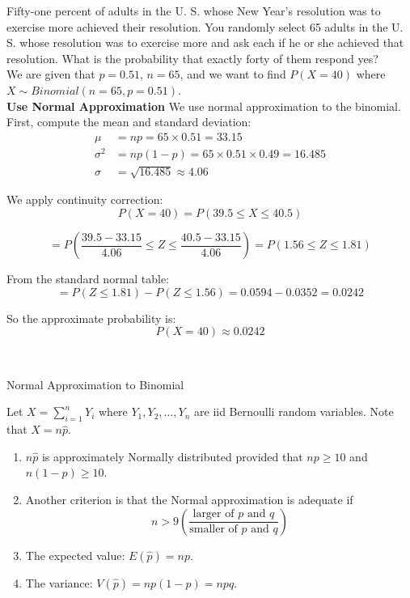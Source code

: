 \begin{example}

Fifty-one percent of adults in the U. S. whose New Year’s resolution was to exercise more achieved their resolution. You randomly select 65 adults in the U. S. whose resolution was to exercise more and ask each if he or she achieved that resolution. What is the probability that exactly forty of them respond yes?\\

We are given that $p = 0.51$, $n = 65$, and we want to find $P(X = 40)$ where $X \sim Binomial(n = 65, p = 0.51)$.\\

\textbf{Use Normal Approximation}
\vspace{0.5 em}
We use normal approximation to the binomial. First, compute the mean and standard deviation:
\begin{align*}
\mu &= np = 65 \times 0.51 = 33.15 \\
\sigma^2 &= np(1-p) = 65 \times 0.51 \times 0.49 = 16.485 \\
\sigma &= \sqrt{16.485} \approx 4.06
\end{align*}


We apply continuity correction:
\[
P(X = 40) = P(39.5 \leq X \leq 40.5)
\]

\[
= P\left(\frac{39.5 - 33.15}{4.06} \leq Z \leq \frac{40.5 - 33.15}{4.06}\right) = P(1.56 \leq Z \leq 1.81)
\]

From the standard normal table:
\[
= P(Z \leq 1.81) - P(Z \leq 1.56) = 0.0594 - 0.0352 = 0.0242
\]

So the approximate probability is:
\[
P(X = 40) \approx 0.0242
\]
\end{example}

\
\vspace{1em}
\begin{frame}{Normal Approximation to Binomial}

Let $X = \sum_{i=1}^{n} Y_i$ where $Y_1, Y_2, \ldots, Y_n$ are iid Bernoulli random variables. Note that $X = n\hat{p}$.

\begin{enumerate}
    \item $n\hat{p}$ is approximately Normally distributed provided that $np \geq 10$ and $n(1 - p) \geq 10$.

    \item Another criterion is that the Normal approximation is adequate if
    \[
    n > 9 \left( \frac{\text{larger of $p$ and $q$}}{\text{smaller of $p$ and $q$}} \right)
    \]

    \item The expected value: $E(\hat{p}) = np$.

    \item The variance: $V(\hat{p}) = np(1 - p) = npq$.
\end{enumerate}

\end{frame}

\vspace{1\baselineskip}  %





